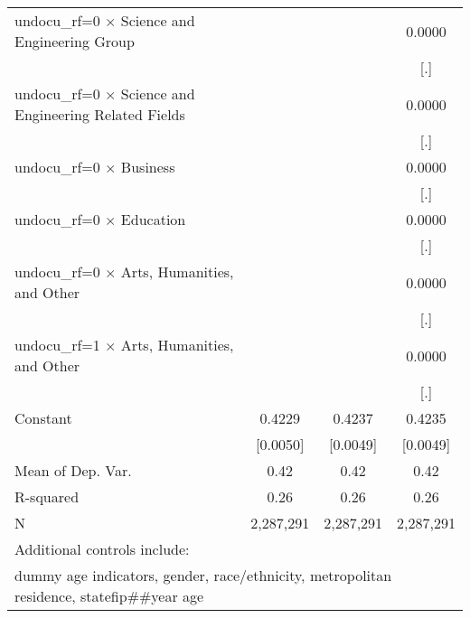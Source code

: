 \begin{table}[htbp]
\begin{tabular}{l*{3}{c}}
\addlinespace
undocu\_rf=0 $\times$ Science and Engineering Group&                     &                     &      0.0000         \\
                    &                     &                     &         [.]         \\
\addlinespace
undocu\_rf=0 $\times$ Science and Engineering Related Fields&                     &                     &      0.0000         \\
                    &                     &                     &         [.]         \\
\addlinespace
undocu\_rf=0 $\times$ Business&                     &                     &      0.0000         \\
                    &                     &                     &         [.]         \\
\addlinespace
undocu\_rf=0 $\times$ Education&                     &                     &      0.0000         \\
                    &                     &                     &         [.]         \\
\addlinespace
undocu\_rf=0 $\times$ Arts, Humanities, and Other&                     &                     &      0.0000         \\
                    &                     &                     &         [.]         \\
\addlinespace
undocu\_rf=1 $\times$ Arts, Humanities, and Other&                     &                     &      0.0000         \\
                    &                     &                     &         [.]         \\
\addlinespace
Constant            &      0.4229\sym{***}&      0.4237\sym{***}&      0.4235\sym{***}\\
                    &    [0.0050]         &    [0.0049]         &    [0.0049]         \\
\midrule
Mean of Dep. Var.   &        0.42         &        0.42         &        0.42         \\
R-squared           &        0.26         &        0.26         &        0.26         \\
N                   &   2,287,291         &   2,287,291         &   2,287,291         \\
\bottomrule
\multicolumn{4}{l}{\footnotesize Additional controls include:}\\
\multicolumn{4}{l}{\footnotesize dummy age indicators, gender, race/ethnicity, metropolitan residence, statefip##year age}\\

\end{tabular}
\end{table}
